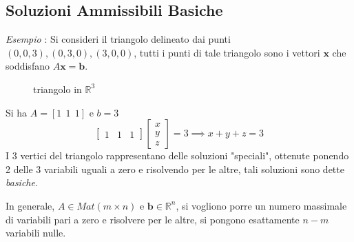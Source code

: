 \documentclass[10pt, letterpaper]{report}
\begin{document}
\subsection{Soluzioni Ammissibili Basiche}
\textit{Esempio} : Si consideri il triangolo delineato dai punti $(0,0,3),(0,3,0),(3,0,0)$, tutti i punti di tale triangolo sono i vettori $\mathbf x$ che soddisfano $A\mathbf x = \mathbf b$.\begin{figure}[h]
    \caption{triangolo in $\mathbb R^3$}
\end{figure}
Si ha $A=[1 \ \ 1 \ \ 1]$ e $b=3$
$$ \begin{bmatrix}
    1 & 1 & 1
\end{bmatrix}\begin{bmatrix}
    x \\ y \\ z
\end{bmatrix}=3\implies x+y+z=3$$
I 3 vertici del triangolo rappresentano delle soluzioni "speciali", ottenute ponendo 2 delle 3 variabili uguali a zero e risolvendo per le altre, tali soluzioni sono dette \textit{basiche}.\bigskip 

In generale, $A\in Mat(m\times n)$ e $\mathbf b \in \mathbb R^n$, si vogliono porre un numero massimale di variabili pari a zero e risolvere per le altre, si pongono esattamente $n-m$ variabili nulle. 
\end{document}
